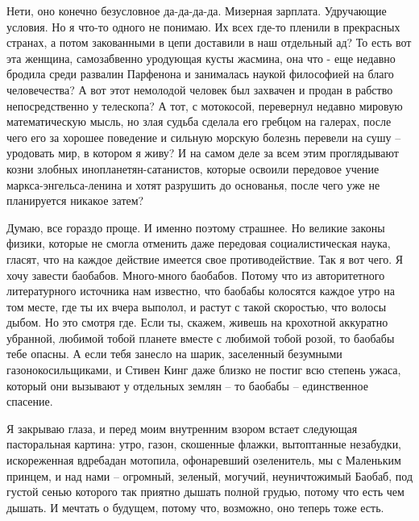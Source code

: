 Нети, оно конечно безусловное да-да-да-да. Мизерная зарплата. Удручающие
условия. Но я что-то одного не понимаю. Их всех где-то пленили в прекрасных
странах, а потом закованными в цепи доставили в наш отдельный ад? То есть вот
эта женщина, самозабвенно уродующая кусты жасмина, она что - еще недавно
бродила среди развалин Парфенона и занималась наукой философией на благо
человечества? А вот этот немолодой человек был захвачен и продан в рабство
непосредственно у телескопа? А тот, с мотокосой, перевернул недавно мировую
математическую мысль, но злая судьба сделала его гребцом на галерах, после чего
его за хорошее поведение и сильную морскую болезнь перевели на сушу – уродовать
мир, в котором я живу? И на самом деле за всем этим проглядывают козни злобных
инопланетян-сатанистов, которые освоили передовое учение маркса-энгельса-ленина
и хотят разрушить до основанья, после чего уже не планируется никакое затем?

Думаю, все гораздо проще. И именно поэтому страшнее. Но великие законы физики,
которые не смогла отменить даже передовая социалистическая наука, гласят, что
на каждое действие имеется свое противодействие. Так я вот чего. Я хочу завести
баобабов. Много-много баобабов. Потому что из авторитетного литературного
источника нам известно, что баобабы колосятся каждое утро на том месте, где ты
их вчера выполол, и растут с такой скоростью, что волосы дыбом. Но это смотря
где. Если ты, скажем, живешь на крохотной аккуратно убранной, любимой тобой
планете вместе с любимой тобой розой, то баобабы тебе опасны. А если тебя
занесло на шарик, заселенный безумными газонокосильщиками, и Стивен Кинг даже
близко не постиг всю степень ужаса, который они вызывают у отдельных землян –
то баобабы – единственное спасение.

Я закрываю глаза, и перед моим внутренним взором встает следующая пасторальная
картина: утро, газон, скошенные флажки, вытоптанные незабудки, искореженная
вдребадан мотопила, офонаревший озеленитель, мы с Маленьким принцем, и над нами
– огромный, зеленый, могучий, неуничтожимый Баобаб, под густой сенью которого
так приятно дышать полной грудью, потому что есть чем дышать. И мечтать о
будущем, потому что, возможно, оно теперь тоже есть.
